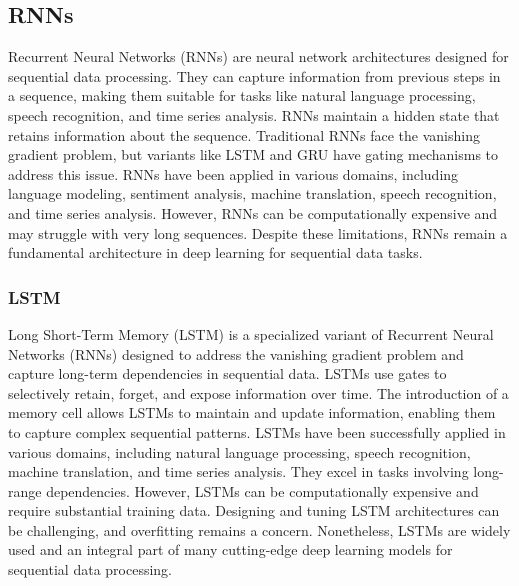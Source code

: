 \documentclass[11pt,a4paper]{article}
\begin{document}
\subsection{RNNs}
Recurrent Neural Networks (RNNs) are neural network architectures designed for sequential data processing. They can capture information from previous steps in a sequence, making them suitable for tasks like natural language processing, speech recognition, and time series analysis. RNNs maintain a hidden state that retains information about the sequence. Traditional RNNs face the vanishing gradient problem, but variants like LSTM and GRU have gating mechanisms to address this issue. RNNs have been applied in various domains, including language modeling, sentiment analysis, machine translation, speech recognition, and time series analysis. However, RNNs can be computationally expensive and may struggle with very long sequences. Despite these limitations, RNNs remain a fundamental architecture in deep learning for sequential data tasks.
\subsubsection{LSTM}
Long Short-Term Memory (LSTM) is a specialized variant of Recurrent Neural Networks (RNNs) designed to address the vanishing gradient problem and capture long-term dependencies in sequential data. LSTMs use gates to selectively retain, forget, and expose information over time. The introduction of a memory cell allows LSTMs to maintain and update information, enabling them to capture complex sequential patterns. LSTMs have been successfully applied in various domains, including natural language processing, speech recognition, machine translation, and time series analysis. They excel in tasks involving long-range dependencies. However, LSTMs can be computationally expensive and require substantial training data. Designing and tuning LSTM architectures can be challenging, and overfitting remains a concern. Nonetheless, LSTMs are widely used and an integral part of many cutting-edge deep learning models for sequential data processing.
\end{document}

